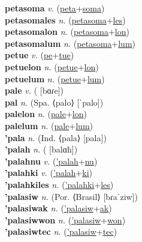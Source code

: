 \textbf{petasoma} \textit{v.} (\hyperref[peta]{peta}+\hyperref[soma]{soma})
 \label{petasoma} \\
\textbf{petasomales} \textit{n.} (\hyperref[petasoma]{petasoma}+\hyperref[les]{les})
 \label{petasomales} \\
\textbf{petasomalon} \textit{n.} (\hyperref[petasoma]{petasoma}+\hyperref[lon]{lon})
 \label{petasomalon} \\
\textbf{petasomalum} \textit{n.} (\hyperref[petasoma]{petasoma}+\hyperref[lum]{lum})
 \label{petasomalum} \\
\textbf{petue} \textit{v.} (\hyperref[pe]{pe}+\hyperref[tue]{tue})
 \label{petue} \\
\textbf{petuelon} \textit{n.} (\hyperref[petue]{petue}+\hyperref[lon]{lon})
 \label{petuelon} \\
\textbf{petuelum} \textit{n.} (\hyperref[petue]{petue}+\hyperref[lum]{lum})
 \label{petuelum} \\
\textbf{pale} \textit{v.} ( [bɑɾe])
 \label{pale} \\
\textbf{pal} \textit{n.} (Spa. ⟨palo⟩ [ˈpalo])
 \label{pal} \\
\textbf{palelon} \textit{n.} (\hyperref[pale]{pale}+\hyperref[lon]{lon})
 \label{palelon} \\
\textbf{palelum} \textit{n.} (\hyperref[pale]{pale}+\hyperref[lum]{lum})
 \label{palelum} \\
\textbf{'pala} \textit{n.} (Ind. ⟨pala⟩ [pala])
 \label{'pala} \\
\textbf{'palah} \textit{n.} ( [balɑħ])
 \label{'palah} \\
\textbf{'palahnu} \textit{v.} (\hyperref['palah]{'palah}+\hyperref[nu]{nu})
 \label{'palahnu} \\
\textbf{'palahki} \textit{v.} (\hyperref['palah]{'palah}+\hyperref[ki]{ki})
 \label{'palahki} \\
\textbf{'palahkiles} \textit{n.} (\hyperref['palahki]{'palahki}+\hyperref[les]{les})
 \label{'palahkiles} \\
\textbf{'palasiw} \textit{n.} (Por. ⟨Brasil⟩ [bɾaˈziw])
 \label{'palasiw} \\
\textbf{'palasiwak} \textit{n.} (\hyperref['palasiw]{'palasiw}+\hyperref[ak]{ak})
 \label{'palasiwak} \\
\textbf{'palasiwwon} \textit{n.} (\hyperref['palasiw]{'palasiw}+\hyperref[won]{won})
 \label{'palasiwwon} \\
\textbf{'palasiwtec} \textit{n.} (\hyperref['palasiw]{'palasiw}+\hyperref[tec]{tec})
 \label{'palasiwtec} \\
